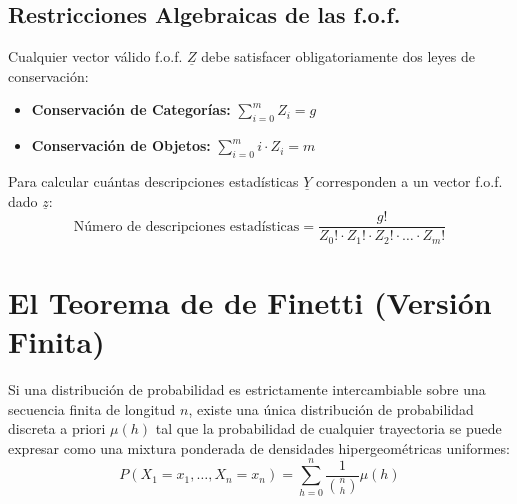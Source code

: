 \documentclass[10pt]{book}
\begin{document}
\subsection*{Restricciones Algebraicas de las f.o.f.}
Cualquier vector válido f.o.f. $\underline{Z}$ debe satisfacer obligatoriamente dos leyes de conservación:
\begin{itemize}
    \item \textbf{Conservación de Categorías:} $\sum_{i=0}^{m} Z_i = g$
    \item \textbf{Conservación de Objetos:} $\sum_{i=0}^{m} i \cdot Z_i = m$
\end{itemize}
Para calcular cuántas descripciones estadísticas $\underline{Y}$ corresponden a un vector f.o.f. dado $\underline{z}$:
\begin{equation}
    \text{Número de descripciones estadísticas} = \frac{g!}{Z_0! \cdot Z_1! \cdot Z_2! \cdot \dots \cdot Z_m!}
\end{equation}

\section{El Teorema de de Finetti (Versión Finita)}

\begin{teo}
Si una distribución de probabilidad es estrictamente intercambiable sobre una secuencia finita de longitud $n$, existe una única distribución de probabilidad discreta a priori $\mu(h)$ tal que la probabilidad de cualquier trayectoria se puede expresar como una mixtura ponderada de densidades hipergeométricas uniformes:
\begin{equation}
    P(X_1 = x_1, \dots, X_n = x_n) = \sum_{h=0}^{n} \frac{1}{\binom{n}{h}} \mu(h)
\end{equation}
\end{teo}
\end{document}
